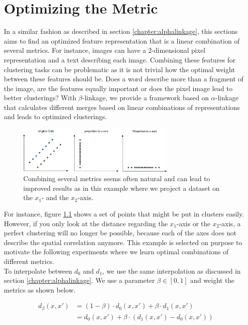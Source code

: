 \chapter{Optimizing the Metric}
\label{sec:beta}

In a similar fashion as described in section \ref{chapter:alphalinkage}, this sections aims to find an optimized feature representation that is a linear combination of several metrics. For instance, images can have a 2-dimensional pixel representation and a text describing each image. Combining these features for clustering tasks can be problematic as it is not trivial how the optimal weight between these features should be. Does a word describe more than a fragment of the image, are the features equally important or does the pixel image lead to better clusterings? With $\beta$-linkage, we provide a framework based on $\alpha$-linkage that calculates different merges based on linear combinations of representations and leads to optimized clusterings.

\begin{figure}[h]
    \centering
    \includegraphics[width=0.7\textwidth]{images/ExampleDataset}
    \caption{Combining several metrics seems often natural and can lead to improved results as in this example where we project a dataset on the $x_1$- and the $x_2$-axis.}
    \label{fig:metrics}
\end{figure}

For instance, figure \ref{fig:metrics} shows a set of points that might be put in clusters easily. However, if you only look at the distance regarding the $x_1$-axis or the $x_2$-axis, a perfect clustering will no longer be possible, because each of the axes does not describe the spatial correlation anymore. This example is selected on purpose to motivate the following experiments where we learn optimal combinations of different metrics.\\ 

To interpolate between $d_0$ and $d_1$, we use the same interpolation as discussed in section \ref{chapter:alphalinkage}. We use a parameter $\beta \in [0,1]$ and weight the metrics as shown below.

\begin{align}
d_\beta(x,x') &= (1 - \beta) \cdot d_0(x,x') + \beta \cdot d_1(x,x') \nonumber \\
&= d_0(x,x') + \beta \cdot (d_1(x,x') - d_0(x,x'))
\label{eq:betalinkage}
\end{align}

